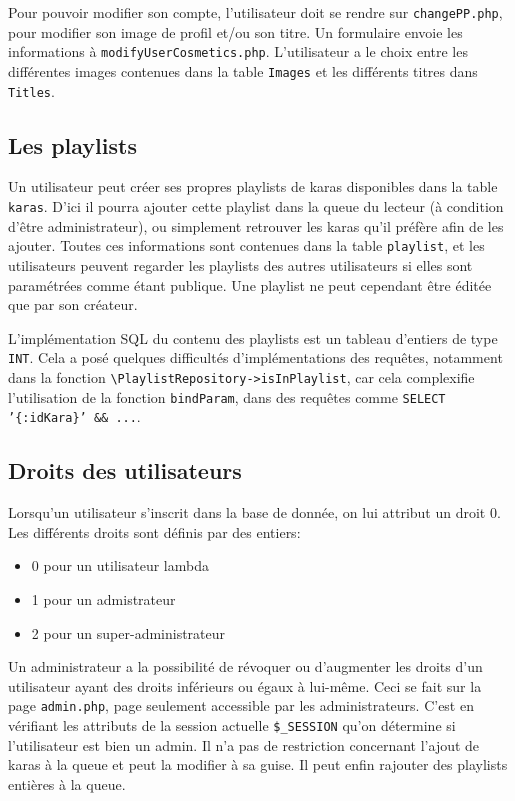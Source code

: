 Pour pouvoir modifier son compte, l'utilisateur doit se rendre sur \texttt{changePP.php}, pour modifier son image de profil et/ou son titre. Un formulaire envoie les informations à \texttt{modifyUserCosmetics.php}. L'utilisateur a le choix entre les différentes images contenues dans la table \texttt{Images} et les différents titres dans \texttt{Titles}.

\subsection{Les playlists}

Un utilisateur peut créer ses propres playlists de karas disponibles dans la table \texttt{karas}.
D'ici il pourra ajouter cette playlist dans la queue du lecteur (à condition d'être administrateur), ou simplement retrouver les karas qu'il préfère afin de les ajouter.
Toutes ces informations sont contenues dans la table \texttt{playlist}, et les utilisateurs peuvent regarder les playlists des autres utilisateurs si elles sont paramétrées comme étant publique.
Une playlist ne peut cependant être éditée que par son créateur.

L'implémentation SQL du contenu des playlists est un tableau d'entiers de type \texttt{INT\lbrack\rbrack}. Cela a posé quelques difficultés d'implémentations des requêtes, notamment dans la fonction \texttt{\textbackslash PlaylistRepository->isInPlaylist}, car cela complexifie l'utilisation de la fonction \texttt{bindParam}, dans des requêtes comme \texttt{SELECT '\{:idKara\}' \&\& ...}. 

\subsection{Droits des utilisateurs}
Lorsqu'un utilisateur s'inscrit dans la base de donnée, on lui attribut un droit 0. Les différents droits sont définis par des entiers:
\begin{itemize}
	\item 0 pour un utilisateur lambda
	\item 1 pour un admistrateur
	\item 2 pour un super-administrateur
\end{itemize}
Un administrateur a la possibilité de révoquer ou d'augmenter les droits d'un utilisateur ayant des droits inférieurs ou égaux à lui-même. Ceci se fait sur la page \texttt{admin.php}, page seulement accessible par les administrateurs. C'est en vérifiant les attributs de la session actuelle \texttt{\$\_SESSION} qu'on détermine si l'utilisateur est bien un admin. Il n'a pas de restriction concernant l'ajout de karas à la queue et peut la modifier à sa guise. Il peut enfin rajouter des playlists entières à la queue.
